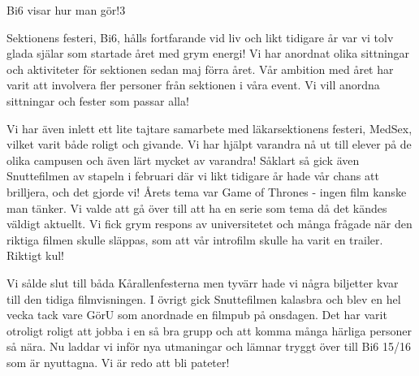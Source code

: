 \begin{news}{3}{Bi6 visar hur man gör!}{}{}{3}

Sektionens festeri, Bi6, hålls fortfarande vid liv och likt tidigare år var
vi tolv glada själar som startade året med grym energi! Vi har anordnat olika
sittningar och aktiviteter för sektionen sedan maj förra året. Vår ambition med
året har varit att involvera fler personer från sektionen i våra event. Vi vill
anordna sittningar och fester som passar alla! 

Vi har även inlett ett lite
tajtare samarbete med läkarsektionens festeri, MedSex, vilket varit både roligt
och givande. Vi har hjälpt varandra nå ut till elever på de olika campusen och
även lärt mycket av varandra! Såklart så gick även Snuttefilmen av stapeln i
februari där vi likt tidigare år hade vår chans att brilljera, och det gjorde
vi! Årets tema var Game of Thrones - ingen film kanske man tänker. Vi valde att
gå över till att ha en serie som tema då det kändes väldigt aktuellt. Vi fick
grym respons av universitetet och många frågade när den riktiga filmen skulle
släppas, som att vår introfilm skulle ha varit en trailer. Riktigt kul!

Vi sålde slut till båda Kårallenfesterna men tyvärr hade vi några biljetter 
kvar till den tidiga filmvisningen. I övrigt gick Snuttefilmen kalasbra och 
blev en hel vecka tack vare GörU som anordnade en filmpub på onsdagen. Det har 
varit otroligt roligt att jobba i en så bra grupp och att komma många härliga
personer så nära. Nu laddar vi inför nya utmaningar och lämnar tryggt över till
Bi6 15/16 som är nyuttagna. Vi är redo att bli pateter!
\\



\end{news}
